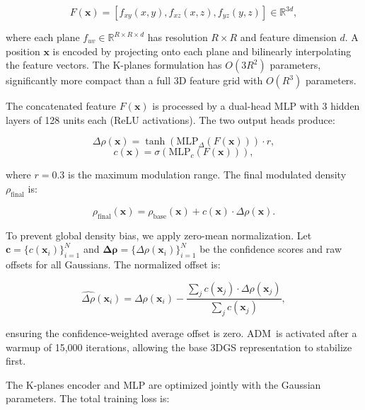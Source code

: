 \documentclass{egPublStyle}
\newcommand{\adm}{ADM}
\begin{document}
\begin{equation}
F(\mathbf{x}) = [f_{xy}(x,y), f_{xz}(x,z), f_{yz}(y,z)] \in \mathbb{R}^{3d},
\label{eq:adm_kplanes}
\end{equation}

where each plane $f_{uv} \in \mathbb{R}^{R \times R \times d}$ has resolution $R \times R$ and feature dimension $d$. A position $\mathbf{x}$ is encoded by projecting onto each plane and bilinearly interpolating the feature vectors. The K-planes formulation has $O(3R^2)$ parameters, significantly more compact than a full 3D feature grid with $O(R^3)$ parameters.

The concatenated feature $F(\mathbf{x})$ is processed by a dual-head MLP with 3 hidden layers of 128 units each (ReLU activations). The two output heads produce:

\begin{equation}
\Delta\rho(\mathbf{x}) = \tanh(\text{MLP}_{\Delta}(F(\mathbf{x}))) \cdot r,
\label{eq:adm_offset}
\end{equation}
\begin{equation}
c(\mathbf{x}) = \sigma(\text{MLP}_{c}(F(\mathbf{x}))),
\label{eq:adm_conf}
\end{equation}

where $r = 0.3$ is the maximum modulation range. The final modulated density $\rho_{\text{final}}$ is:

\begin{equation}
\rho_{\text{final}}(\mathbf{x}) = \rho_{\text{base}}(\mathbf{x}) + c(\mathbf{x}) \cdot \Delta\rho(\mathbf{x}).
\label{eq:adm_final}
\end{equation}

To prevent global density bias, we apply zero-mean normalization. Let $\mathbf{c} = \{c(\mathbf{x}_i)\}_{i=1}^{N}$ and $\boldsymbol{\Delta\rho} = \{\Delta\rho(\mathbf{x}_i)\}_{i=1}^{N}$ be the confidence scores and raw offsets for all Gaussians. The normalized offset is:

\begin{equation}
\hat{\Delta\rho}(\mathbf{x}_i) = \Delta\rho(\mathbf{x}_i) - \frac{\sum_{j} c(\mathbf{x}_j) \cdot \Delta\rho(\mathbf{x}_j)}{\sum_{j} c(\mathbf{x}_j)},
\label{eq:adm_zeromean}
\end{equation}

ensuring the confidence-weighted average offset is zero. \adm\ is activated after a warmup of 15,000 iterations, allowing the base 3DGS representation to stabilize first.

The K-planes encoder and MLP are optimized jointly with the Gaussian parameters. The total training loss is:
\end{document}
